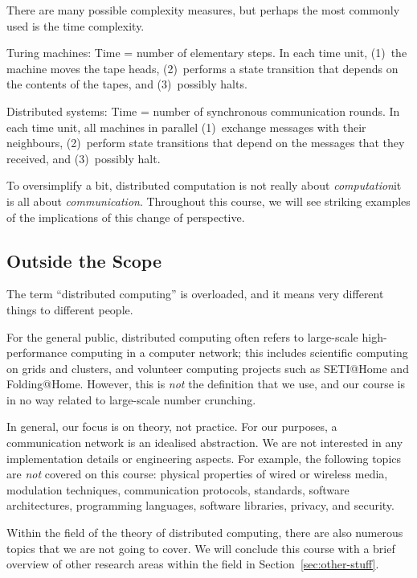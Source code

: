\begin{description}
\begin{descriptionb}
    \end{descriptionb}
    \item[Complexity measures.] There are many possible complexity measures, but perhaps the most commonly used is the time complexity.
    \begin{descriptionb}
        \item[Turing machines:] Time = number of elementary steps. In each time unit, (1)~the machine moves the tape heads, (2)~performs a state transition that depends on the contents of the tapes, and (3)~possibly halts.
        \item[Distributed systems:] Time = number of synchronous communication rounds. In each time unit, all machines in parallel (1)~exchange messages with their neighbours, (2)~perform state transitions that depend on the messages that they received, and (3)~possibly halt.
    \end{descriptionb}
\end{description}
To oversimplify a bit, distributed computation is not really about \emph{computation}\mydash it is all about \emph{communication}. Throughout this course, we will see striking examples of the implications of this change of perspective.


\subsection{Outside the Scope}

The term ``distributed computing'' is overloaded, and it means very different things to different people.

For the general public, distributed computing often refers to large-scale high-performance computing in a computer network; this includes scientific computing on grids and clusters, and volunteer computing projects such as SETI@Home and Folding@Home. However, this is \emph{not} the definition that we use, and our course is in no way related to large-scale number crunching.

In general, our focus is on theory, not practice. For our purposes, a communication network is an idealised abstraction. We are not interested in any implementation details or engineering aspects. For example, the following topics are \emph{not} covered on this course: physical properties of wired or wireless media, modulation techniques, communication protocols, standards, software architectures, programming languages, software libraries, privacy, and security.

Within the field of the theory of distributed computing, there are also numerous topics that we are not going to cover. We will conclude this course with a brief overview of other research areas within the field in Section~\ref{sec:other-stuff}.


